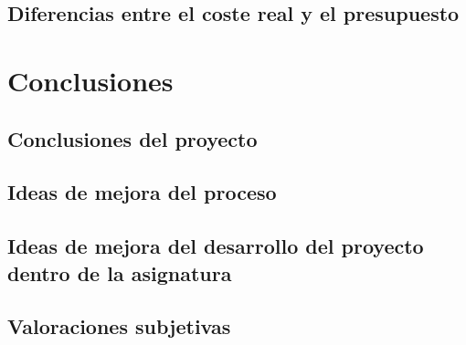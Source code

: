 \documentclass[10pt,spanish]{article}
\begin{document}
\subsection{Diferencias entre el coste real y el presupuesto}

\blindtext

\section{Conclusiones}

\blindtext
\subsection{Conclusiones del proyecto}

\blindtext
\subsection{Ideas de mejora del proceso}

\blindtext
\subsection{Ideas de mejora del desarrollo del proyecto dentro de la asignatura}

\blindtext
\subsection{Valoraciones subjetivas}

\blindtext
\appendix

\end{document}
